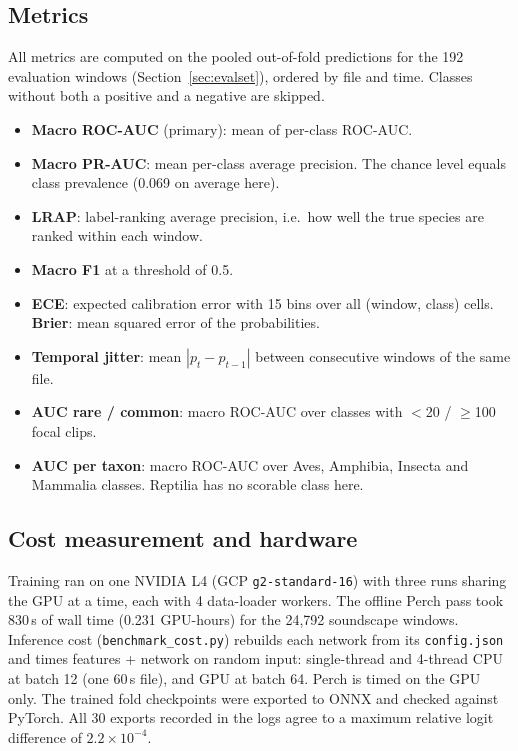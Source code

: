 \documentclass[11pt]{article}
\begin{document}
\subsection{Metrics}
All metrics are computed on the pooled out-of-fold predictions for the 192
evaluation windows (Section~\ref{sec:evalset}), ordered by file and time.
Classes without both a positive and a negative are skipped.
\begin{itemize}
  \item \textbf{Macro ROC-AUC} (primary): mean of per-class ROC-AUC.
  \item \textbf{Macro PR-AUC}: mean per-class average precision. The chance
        level equals class prevalence (0.069 on average here).
  \item \textbf{LRAP}: label-ranking average precision, i.e.\ how well the
        true species are ranked within each window.
  \item \textbf{Macro F1} at a threshold of 0.5.
  \item \textbf{ECE}: expected calibration error with 15 bins over all
        (window, class) cells. \textbf{Brier}: mean squared error of the
        probabilities.
  \item \textbf{Temporal jitter}: mean $|p_t-p_{t-1}|$ between consecutive
        windows of the same file.
  \item \textbf{AUC rare / common}: macro ROC-AUC over classes with $<$20 /
        $\ge$100 focal clips.
  \item \textbf{AUC per taxon}: macro ROC-AUC over Aves, Amphibia, Insecta and
        Mammalia classes. Reptilia has no scorable class here.
\end{itemize}

\subsection{Cost measurement and hardware}
Training ran on one NVIDIA L4 (GCP \texttt{g2-standard-16}) with three runs
sharing the GPU at a time, each with 4 data-loader workers. The offline Perch
pass took 830\,s of wall time (0.231 GPU-hours) for the 24{,}792 soundscape
windows. Inference cost (\texttt{benchmark\_cost.py}) rebuilds each network
from its \texttt{config.json} and times features + network on random input:
single-thread and 4-thread CPU at batch 12 (one 60\,s file), and GPU at batch
64. Perch is timed on the GPU only. The trained fold checkpoints were exported to ONNX and checked against
PyTorch. All 30 exports recorded in the logs agree to a maximum relative logit
difference of $2.2\times10^{-4}$.
\end{document}
